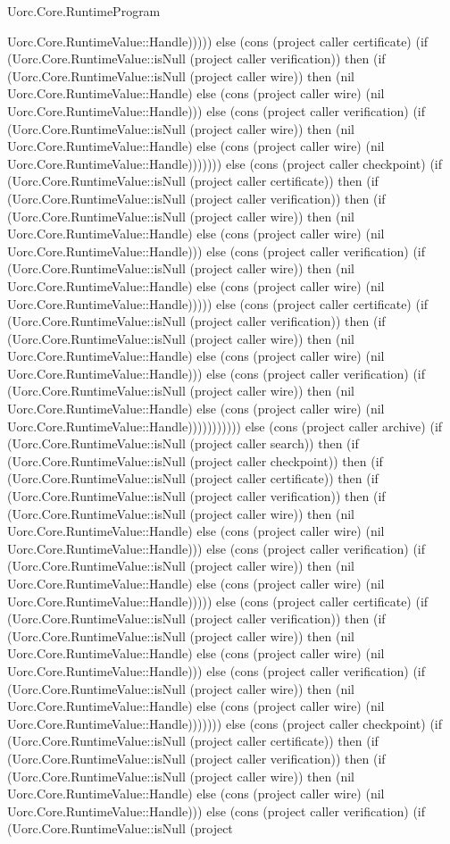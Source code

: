 \begin{lexlean}{Uorc.Core.RuntimeProgram}
\begin{semanticmodule}
{Uorc.Core.RuntimeValue::Handle))))) else (cons (project caller certificate) (if (Uorc.Core.RuntimeValue::isNull (project caller verification)) then (if (Uorc.Core.RuntimeValue::isNull (project caller wire)) then (nil Uorc.Core.RuntimeValue::Handle) else (cons (project caller wire) (nil Uorc.Core.RuntimeValue::Handle))) else (cons (project caller verification) (if (Uorc.Core.RuntimeValue::isNull (project caller wire)) then (nil Uorc.Core.RuntimeValue::Handle) else (cons (project caller wire) (nil Uorc.Core.RuntimeValue::Handle))))))) else (cons (project caller checkpoint) (if (Uorc.Core.RuntimeValue::isNull (project caller certificate)) then (if (Uorc.Core.RuntimeValue::isNull (project caller verification)) then (if (Uorc.Core.RuntimeValue::isNull (project caller wire)) then (nil Uorc.Core.RuntimeValue::Handle) else (cons (project caller wire) (nil Uorc.Core.RuntimeValue::Handle))) else (cons (project caller verification) (if (Uorc.Core.RuntimeValue::isNull (project caller wire)) then (nil Uorc.Core.RuntimeValue::Handle) else (cons (project caller wire) (nil Uorc.Core.RuntimeValue::Handle))))) else (cons (project caller certificate) (if (Uorc.Core.RuntimeValue::isNull (project caller verification)) then (if (Uorc.Core.RuntimeValue::isNull (project caller wire)) then (nil Uorc.Core.RuntimeValue::Handle) else (cons (project caller wire) (nil Uorc.Core.RuntimeValue::Handle))) else (cons (project caller verification) (if (Uorc.Core.RuntimeValue::isNull (project caller wire)) then (nil Uorc.Core.RuntimeValue::Handle) else (cons (project caller wire) (nil Uorc.Core.RuntimeValue::Handle))))))))))) else (cons (project caller archive) (if (Uorc.Core.RuntimeValue::isNull (project caller search)) then (if (Uorc.Core.RuntimeValue::isNull (project caller checkpoint)) then (if (Uorc.Core.RuntimeValue::isNull (project caller certificate)) then (if (Uorc.Core.RuntimeValue::isNull (project caller verification)) then (if (Uorc.Core.RuntimeValue::isNull (project caller wire)) then (nil Uorc.Core.RuntimeValue::Handle) else (cons (project caller wire) (nil Uorc.Core.RuntimeValue::Handle))) else (cons (project caller verification) (if (Uorc.Core.RuntimeValue::isNull (project caller wire)) then (nil Uorc.Core.RuntimeValue::Handle) else (cons (project caller wire) (nil Uorc.Core.RuntimeValue::Handle))))) else (cons (project caller certificate) (if (Uorc.Core.RuntimeValue::isNull (project caller verification)) then (if (Uorc.Core.RuntimeValue::isNull (project caller wire)) then (nil Uorc.Core.RuntimeValue::Handle) else (cons (project caller wire) (nil Uorc.Core.RuntimeValue::Handle))) else (cons (project caller verification) (if (Uorc.Core.RuntimeValue::isNull (project caller wire)) then (nil Uorc.Core.RuntimeValue::Handle) else (cons (project caller wire) (nil Uorc.Core.RuntimeValue::Handle))))))) else (cons (project caller checkpoint) (if (Uorc.Core.RuntimeValue::isNull (project caller certificate)) then (if (Uorc.Core.RuntimeValue::isNull (project caller verification)) then (if (Uorc.Core.RuntimeValue::isNull (project caller wire)) then (nil Uorc.Core.RuntimeValue::Handle) else (cons (project caller wire) (nil Uorc.Core.RuntimeValue::Handle))) else (cons (project caller verification) (if (Uorc.Core.RuntimeValue::isNull (project }
\end{semanticmodule}
\end{lexlean}
